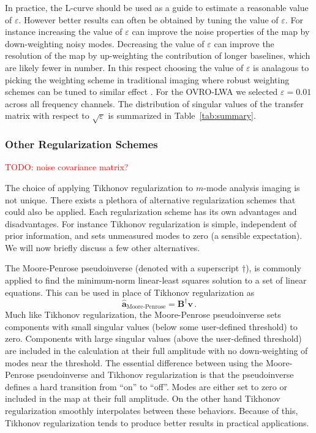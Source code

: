\documentclass[twocolumn]{aastex61}
\newcommand{\todo}[1]{\textcolor{red}{TODO: #1}\PackageWarning{TODO:}{#1!}}
\renewcommand{\b}{\pmb}
\begin{document}
In practice, the L-curve should be used as a guide to estimate a reasonable value of $\varepsilon$.
However better results can often be obtained by tuning the value of $\varepsilon$. For instance
increasing the value of $\varepsilon$ can improve the noise properties of the map by down-weighting
noisy modes. Decreasing the value of $\varepsilon$ can improve the resolution of the map by
up-weighting the contribution of longer baselines, which are likely fewer in number. In this respect
choosing the value of $\varepsilon$ is analagous to picking the weighting scheme in traditional
imaging where robust weighting schemes can be tuned to similar effect \citep{briggs}.  For the
OVRO-LWA we selected $\varepsilon = 0.01$ across all frequency channels. The distribution of
singular values of the transfer matrix with respect to $\sqrt{\varepsilon}$ is summarized in
Table~\ref{tab:summary}.

\subsubsection{Other Regularization Schemes}

\todo{noise covariance matrix?}

The choice of applying Tikhonov regularization to $m$-mode analysis imaging is not unique. There
exists a plethora of alternative regularization schemes that could also be applied. Each
regularization scheme has its own advantages and disadvantages. For instance Tikhonov regularization
is simple, independent of prior information, and sets unmeasured modes to zero (a sensible
expectation). We will now briefly discuss a few other alternatives.

The Moore-Penrose pseudoinverse (denoted with a superscript $\dagger$), is commonly applied to find
the minimum-norm linear-least squares solution to a set of linear equations. This can be used in
place of Tikhonov regularization as
\begin{equation}
    \b{\hat a}_\text{Moore-Penrose} = \b B^\dagger\b v\,.
\end{equation}
Much like Tikhonov regularization, the Moore-Penrose pseudoinverse sets components with small
singular values (below some user-defined threshold) to zero. Components with large singular values
(above the user-defined threshold) are included in the calculation at their full amplitude with no
down-weighting of modes near the threshold. The essential difference between using the Moore-Penrose
pseudoinverse and Tikhonov regularization is that the pseudoinverse defines a hard transition from
``on'' to ``off''. Modes are either set to zero or included in the map at their full amplitude. On
the other hand Tikhonov regularization smoothly interpolates between these behaviors. Because of
this, Tikhonov regularization tends to produce better results in practical applications.
\end{document}
